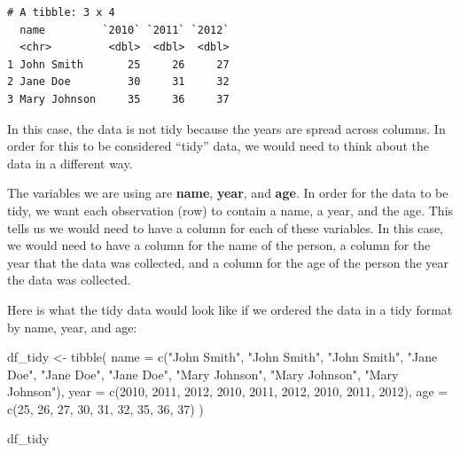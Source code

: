 \documentclass[
  letterpaper,
  DIV=11,
  numbers=noendperiod]{scrreprt}
\newenvironment{Shaded}{\begin{snugshade}}{\end{snugshade}}
\newcommand{\AttributeTok}[1]{\textcolor[rgb]{0.40,0.45,0.13}{#1}}
\newcommand{\DecValTok}[1]{\textcolor[rgb]{0.68,0.00,0.00}{#1}}
\newcommand{\FunctionTok}[1]{\textcolor[rgb]{0.28,0.35,0.67}{#1}}
\newcommand{\NormalTok}[1]{\textcolor[rgb]{0.00,0.23,0.31}{#1}}
\newcommand{\OtherTok}[1]{\textcolor[rgb]{0.00,0.23,0.31}{#1}}
\newcommand{\StringTok}[1]{\textcolor[rgb]{0.13,0.47,0.30}{#1}}
\begin{document}
\begin{verbatim}
# A tibble: 3 x 4
  name         `2010` `2011` `2012`
  <chr>         <dbl>  <dbl>  <dbl>
1 John Smith       25     26     27
2 Jane Doe         30     31     32
3 Mary Johnson     35     36     37
\end{verbatim}

In this case, the data is not tidy because the years are spread across
columns. In order for this to be considered ``tidy'' data, we would need
to think about the data in a different way.

The variables we are using are \textbf{name}, \textbf{year}, and
\textbf{age}. In order for the data to be tidy, we want each observation
(row) to contain a name, a year, and the age. This tells us we would
need to have a column for each of these variables. In this case, we
would need to have a column for the name of the person, a column for the
year that the data was collected, and a column for the age of the person
the year the data was collected.

Here is what the tidy data would look like if we ordered the data in a
tidy format by name, year, and age:

\begin{Shaded}
\begin{Highlighting}[]
\NormalTok{df\_tidy }\OtherTok{\textless{}{-}} \FunctionTok{tibble}\NormalTok{(}
  \AttributeTok{name =} \FunctionTok{c}\NormalTok{(}\StringTok{"John Smith"}\NormalTok{, }\StringTok{"John Smith"}\NormalTok{, }\StringTok{"John Smith"}\NormalTok{, }\StringTok{"Jane Doe"}\NormalTok{, }\StringTok{"Jane Doe"}\NormalTok{, }
           \StringTok{"Jane Doe"}\NormalTok{, }\StringTok{"Mary Johnson"}\NormalTok{, }\StringTok{"Mary Johnson"}\NormalTok{, }\StringTok{"Mary Johnson"}\NormalTok{),}
  \AttributeTok{year =} \FunctionTok{c}\NormalTok{(}\DecValTok{2010}\NormalTok{, }\DecValTok{2011}\NormalTok{, }\DecValTok{2012}\NormalTok{, }\DecValTok{2010}\NormalTok{, }\DecValTok{2011}\NormalTok{, }\DecValTok{2012}\NormalTok{, }\DecValTok{2010}\NormalTok{, }\DecValTok{2011}\NormalTok{, }\DecValTok{2012}\NormalTok{),}
  \AttributeTok{age =} \FunctionTok{c}\NormalTok{(}\DecValTok{25}\NormalTok{, }\DecValTok{26}\NormalTok{, }\DecValTok{27}\NormalTok{, }\DecValTok{30}\NormalTok{, }\DecValTok{31}\NormalTok{, }\DecValTok{32}\NormalTok{, }\DecValTok{35}\NormalTok{, }\DecValTok{36}\NormalTok{, }\DecValTok{37}\NormalTok{)}
\NormalTok{)}

\NormalTok{df\_tidy}
\end{Highlighting}
\end{Shaded}
\end{document}

